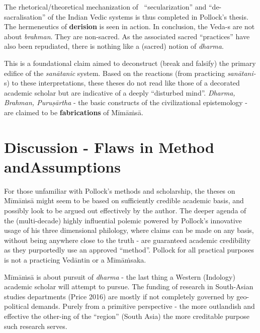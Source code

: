 The rhetorical/theoretical mechanization of  “secularization” and “de-sacralisation” of the Indian Vedic systems is thus completed in Pollock’s thesis. The hermeneutics of \textbf{derision} is seen in action. In conclusion, the Veda-s are not about \textit{brahman}. They are non-sacred. As the associated sacred “practices” have also been repudiated, there is nothing like a (sacred) notion of \textit{dharma}.

This is a foundational claim aimed to deconstruct (break and falsify) the primary edifice of the \textit{sanātanic} system. Based on the reactions (from practicing \textit{sanātani-}s) to these interpretations, these theses do not read like those of a decorated academic scholar but are indicative of a deeply “disturbed mind”. \textit{Dharma, Brahman, Puruṣārtha} - the basic constructs of the civilizational epistemology - are claimed to be \textbf{fabrications} of Mīmāṁsā.


\section*{Discussion - Flaws in Method and\hfill \break Assumptions}

\vskip -6pt

For those unfamiliar with Pollock’s methods and scholarship, the theses on Mīmāṁsā might seem to be based on sufficiently credible academic basis, and possibly look to be argued out effectively by the author. The deeper agenda of the (multi-decade) highly influential polemic powered by Pollock’s innovative usage of his three dimensional philology, where claims can be made on any basis, without being anywhere close to the truth - are guaranteed academic credibility as they purportedly use an approved “method”. Pollock for all practical purposes is not a practicing Vedāntin or a Mīmāṁsaka.

Mīmāṁsā is about pursuit of \textit{dharma} - the last thing a Western (Indology) academic scholar will attempt to pursue. The funding of research in South-Asian studies departments (Price 2016) are mostly if not completely governed by geo-political demands. Purely from a primitive perspective - the more outlandish and effective the other-ing of the “region” (South Asia) the more creditable purpose such research serves. 

